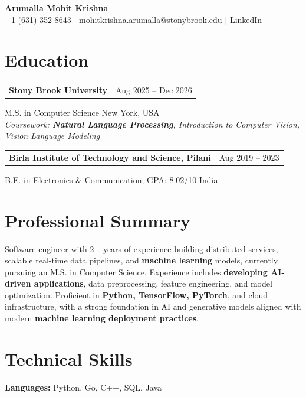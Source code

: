 \documentclass[letterpaper,10pt]{article}
\makeatletter
\newcommand{\entry}[2]{%
  \noindent
  \begin{tabularx}{\linewidth}
    {@{}>{\raggedright\arraybackslash}X@{\hspace{6pt}}r@{}}
    \textbf{#1} & #2
  \end{tabularx}\par
}
\makeatother
\begin{document}
\begin{center}
    {\LARGE\bfseries Arumalla Mohit Krishna}\\[3pt]
    +1 (631) 352-8643 $|$
    \href{mailto:mohitkrishna.arumalla@stonybrook.edu}
    {mohitkrishna.arumalla@stonybrook.edu} $|$
    \href{https://linkedin.com/in/mohit-krishna-arumalla}
    {LinkedIn}
\end{center}
\vspace{-8pt}

\section{Education}

\entry
  {\textbf{Stony Brook University}}
  {Aug 2025 -- Dec 2026}

M.S. in Computer Science \hfill New York, USA\\
\textit{
Coursework: \textbf{Natural Language Processing},
Introduction to Computer Vision, Vision Language Modeling
}
\vspace{3pt}

\entry
  {\textbf{Birla Institute of Technology and Science, Pilani}}
  {Aug 2019 -- 2023}

B.E. in Electronics \& Communication; GPA: 8.02/10 \hfill India
\section{Professional Summary}

Software engineer with 2+ years of experience building distributed services, scalable real-time data pipelines,
and \textbf{machine learning} models, currently pursuing an M.S. in Computer Science. Experience includes
\textbf{developing AI-driven applications}, data preprocessing, feature engineering, and model optimization.
Proficient in \textbf{Python, TensorFlow, PyTorch}, and cloud infrastructure, with a strong foundation in AI and
generative models aligned with modern \textbf{machine learning deployment practices}.

\section{Technical Skills}

\textbf{Languages:}
Python, Go, C++, SQL, Java\\
\end{document}
